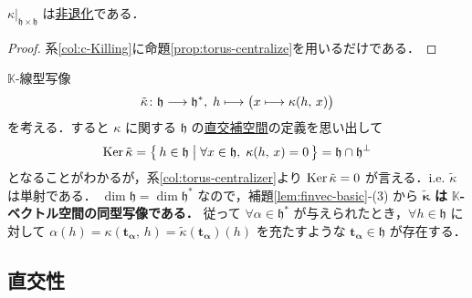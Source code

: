 \documentclass[rep_main]{subfiles}
\begin{document}
\begin{mycol}[label=col:torus-centralizer]{}
	$\kappa|_{\mathfrak{h} \times \mathfrak{h}}$ は\hyperref[def:radical-bilinear]{非退化}である．
\end{mycol}

\begin{proof}
	系\ref{col:c-Killing}に命題\ref{prop:torus-centralize}を用いるだけである．
\end{proof}

$\mathbb{K}$-線型写像
\begin{align}
	\label{eq:isom-h}
	\tilde{\kappa} \colon \mathfrak{h} \longrightarrow \mathfrak{h}^*,\; h \longmapsto \bigl( x \longmapsto \kappa(h,\, x) \bigr) 
\end{align}
を考える．すると $\kappa$ に関する $\mathfrak{h}$ の\hyperref[def:radical-bilinear]{直交補空間}の定義を思い出して
\begin{align}
	\operatorname{Ker} \tilde{\kappa} = \bigl\{\, h \in \mathfrak{h} \bigm| \forall x \in \mathfrak{h},\; \kappa(h,\, x) = 0 \,\bigr\} = \mathfrak{h} \cap \mathfrak{h}^\perp
\end{align}
となることがわかるが，系\ref{col:torus-centralizer}より $\operatorname{Ker} \tilde{\kappa} = 0$ が言える．i.e. $\tilde{\kappa}$ は単射である．
$\dim \mathfrak{h} = \dim \mathfrak{h}^*$ なので，補題\ref{lem:finvec-basic}-(3) から $\bm{\tilde{\kappa}}$ \textbf{は} $\bm{\mathbb{K}}$\textbf{-ベクトル空間の同型写像である．}
従って $\forall \alpha \in \mathfrak{h}^*$ が与えられたとき，$\forall h \in \mathfrak{h}$  に対して $\alpha(h) = \kappa(\bm{t_\alpha},\, h) = \tilde{\kappa}(\bm{t_\alpha})(h)$ を充たすような $\bm{t_\alpha} \in \mathfrak{h}$ が存在する．

\subsection{直交性}
\end{document}
